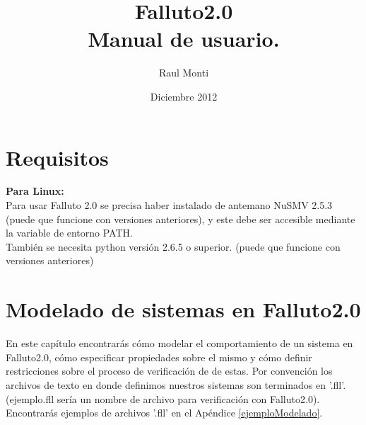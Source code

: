 \documentclass[titlepage, 12pt]{book}
\title{Falluto2.0 \\ Manual de usuario.}
\author{Raul Monti}
\date{Diciembre 2012}
\begin{document}
\maketitle

\newpage
\tableofcontents



\chapter{Requisitos}
\textbf{Para Linux:}\\

Para usar Falluto 2.0 se precisa haber instalado de antemano NuSMV 2.5.3 (puede que funcione con versiones anteriores), y este debe ser accesible mediante la variable de entorno PATH.\\

Tambi\'en se necesita python versión 2.6.5 o superior. (puede que funcione con versiones anteriores)



\chapter{Modelado de sistemas en Falluto2.0}
En este cap\'itulo encontrar\'as c\'omo modelar el comportamiento de un sistema en Falluto2.0, c\'omo especificar propiedades sobre el mismo y c\'omo definir restricciones sobre el proceso de verificaci\'on de de estas.
Por convenci\'on los archivos de texto en donde definimos nuestros sistemas son terminados en '.fll'. (ejemplo.fll ser\'ia un nombre de archivo para verificaci\'on con Falluto2.0).\\
\indent Encontrar\'as ejemplos de archivos '.fll' en el Ap\'endice \ref{ejemploModelado}.


\end{document}
